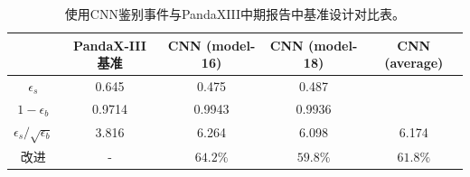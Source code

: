 \begin{table}[hbt]
    \centering
    \begin{tabular}{ccccc}
      \\\hline
      & PandaX-III 基准 & CNN (model-16) & CNN (model-18) & CNN (average) \\\hline
      $\epsilon_{s}$ & 0.645 & 0.475  & 0.487 & \\
      $ 1-\epsilon_{b}$ & 0.9714 & 0.9943  & 0.9936 &\\
      $\epsilon_{s}/\sqrt{\epsilon_{b}}$ & 3.816 & 6.264 & 6.098 & 6.174 \\\hline
      改进 & - & $64.2\%$ & $59.8\%$ & $61.8\%$\\\hline
    \end{tabular}
    \caption{使用CNN鉴别事件与PandaXIII中期报告中基准设计对比表。}
    \label{tab:comparison}
  \end{table}
  

